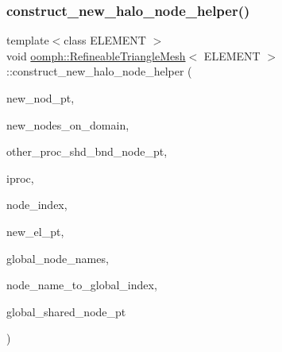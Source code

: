 \mbox{\label{classoomph_1_1RefineableTriangleMesh_a19f9fe6c36b1be3c4ede935c2ad12fcc}} 
\subsubsection{\texorpdfstring{construct\+\_\+new\+\_\+halo\+\_\+node\+\_\+helper()}{construct\_new\_halo\_node\_helper()}}
{\footnotesize\ttfamily template$<$class E\+L\+E\+M\+E\+NT $>$ \\
void \hyperlink{classoomph_1_1RefineableTriangleMesh}{oomph\+::\+Refineable\+Triangle\+Mesh}$<$ E\+L\+E\+M\+E\+NT $>$\+::construct\+\_\+new\+\_\+halo\+\_\+node\+\_\+helper (\begin{DoxyParamCaption}\item[{\hyperlink{classoomph_1_1Node}{Node} $\ast$\&}]{new\+\_\+nod\+\_\+pt,  }\item[{\hyperlink{classoomph_1_1Vector}{Vector}$<$ \hyperlink{classoomph_1_1Node}{Node} $\ast$$>$ \&}]{new\+\_\+nodes\+\_\+on\+\_\+domain,  }\item[{\hyperlink{classoomph_1_1Vector}{Vector}$<$ \hyperlink{classoomph_1_1Vector}{Vector}$<$ \hyperlink{classoomph_1_1Vector}{Vector}$<$ std\+::map$<$ unsigned, \hyperlink{classoomph_1_1Node}{Node} $\ast$$>$ $>$ $>$ $>$ \&}]{other\+\_\+proc\+\_\+shd\+\_\+bnd\+\_\+node\+\_\+pt,  }\item[{unsigned \&}]{iproc,  }\item[{unsigned \&}]{node\+\_\+index,  }\item[{\hyperlink{classoomph_1_1FiniteElement}{Finite\+Element} $\ast$const \&}]{new\+\_\+el\+\_\+pt,  }\item[{\hyperlink{classoomph_1_1Vector}{Vector}$<$ \hyperlink{classoomph_1_1Vector}{Vector}$<$ \hyperlink{classoomph_1_1Vector}{Vector}$<$ unsigned $>$ $>$ $>$ \&}]{global\+\_\+node\+\_\+names,  }\item[{std\+::map$<$ \hyperlink{classoomph_1_1Vector}{Vector}$<$ unsigned $>$, unsigned $>$ \&}]{node\+\_\+name\+\_\+to\+\_\+global\+\_\+index,  }\item[{\hyperlink{classoomph_1_1Vector}{Vector}$<$ \hyperlink{classoomph_1_1Node}{Node} $\ast$$>$ \&}]{global\+\_\+shared\+\_\+node\+\_\+pt }\end{DoxyParamCaption})\hspace{0.3cm}{\ttfamily [protected]}}



